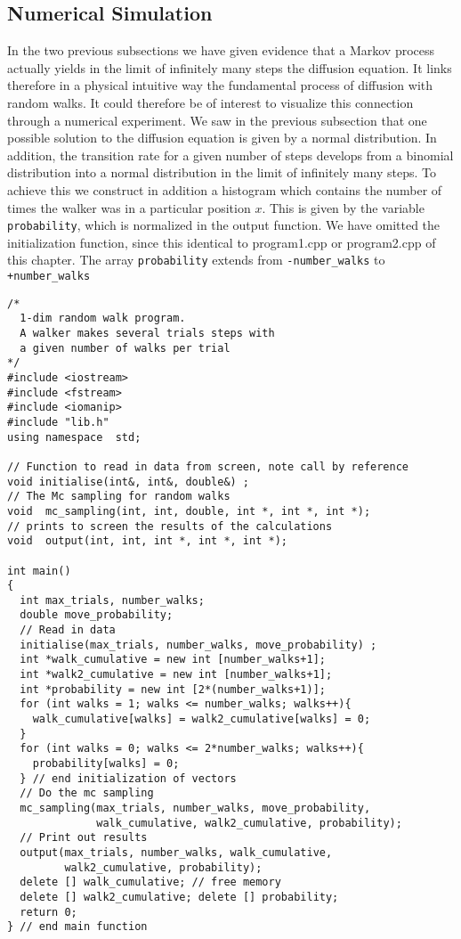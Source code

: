 

\subsection{Numerical Simulation}
In the two previous subsections we have given evidence that a Markov process
actually yields in the limit of infinitely many steps the diffusion equation.
It links therefore in a physical intuitive way the fundamental process of diffusion 
with  random walks. 
It could therefore be of interest to visualize this connection through a numerical
experiment. We saw in the previous subsection that one 
possible solution to the diffusion equation is given by a normal distribution.
In addition, the transition rate for a given number of steps develops from a 
binomial distribution into a normal distribution in the limit of infinitely many
steps. 
To achieve this we construct in addition 
a histogram which contains the number of times the walker was in a particular 
position $x$. This is given by the variable \lstinline{probability},
which is normalized in the output function. We have omitted the  
initialization function, since this identical to program1.cpp or program2.cpp of this
chapter. The array  \lstinline{probability} extends from \lstinline{-number_walks}
to \lstinline{+number_walks}
\begin{lstlisting}[title={\url{http://folk.uio.no/mhjensen/compphys/programs/chapter12/cpp/program2.cpp}}]
/*
  1-dim random walk program. 
  A walker makes several trials steps with
  a given number of walks per trial
*/
#include <iostream>
#include <fstream>
#include <iomanip>
#include "lib.h"
using namespace  std;

// Function to read in data from screen, note call by reference
void initialise(int&, int&, double&) ;
// The Mc sampling for random walks
void  mc_sampling(int, int, double, int *, int *, int *);
// prints to screen the results of the calculations 
void  output(int, int, int *, int *, int *);

int main()
{
  int max_trials, number_walks; 
  double move_probability;
  // Read in data 
  initialise(max_trials, number_walks, move_probability) ;
  int *walk_cumulative = new int [number_walks+1];
  int *walk2_cumulative = new int [number_walks+1];
  int *probability = new int [2*(number_walks+1)];
  for (int walks = 1; walks <= number_walks; walks++){   
    walk_cumulative[walks] = walk2_cumulative[walks] = 0;
  }
  for (int walks = 0; walks <= 2*number_walks; walks++){   
    probability[walks] = 0;
  } // end initialization of vectors
  // Do the mc sampling  
  mc_sampling(max_trials, number_walks, move_probability, 
              walk_cumulative, walk2_cumulative, probability);
  // Print out results 
  output(max_trials, number_walks, walk_cumulative, 
         walk2_cumulative, probability);
  delete [] walk_cumulative; // free memory
  delete [] walk2_cumulative; delete [] probability;
  return 0; 
} // end main function
\end{lstlisting}
